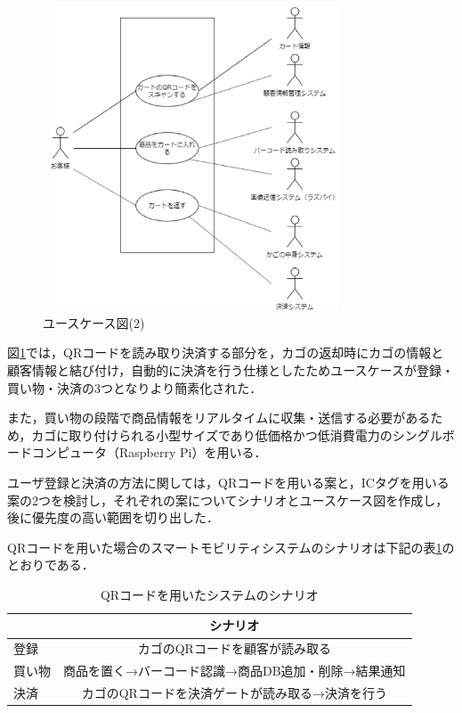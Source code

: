 \begin{figure}[htbp]
\centering
\includegraphics[height = 9cm,width = 9cm]{./picture/usecase3.eps}
\caption{ユースケース図(2)}
\label{usecase3}
\end{figure}


図\ref{usecase3}では，QRコードを読み取り決済する部分を，カゴの返却時にカゴの情報と顧客情報と結び付け，自動的に決済を行う仕様としたためユースケースが登録・買い物・決済の3つとなりより簡素化された．

また，買い物の段階で商品情報をリアルタイムに収集・送信する必要があるため，カゴに取り付けられる小型サイズであり低価格かつ低消費電力のシングルボードコンピュータ（Raspberry Pi）を用いる．

ユーザ登録と決済の方法に関しては，QRコードを用いる案と，ICタグを用いる案の2つを検討し，それぞれの案についてシナリオとユースケース図を作成し，後に優先度の高い範囲を切り出した．


QRコードを用いた場合のスマートモビリティシステムのシナリオは下記の表\ref{sina_qr}のとおりである．


\begin{table}[htb]
\begin{center}
\caption{QRコードを用いたシステムのシナリオ}
\begin{tabular}{|l|c|} \hline
 & シナリオ \\ \hline \hline
登録 & カゴのQRコードを顧客が読み取る \\
買い物 & 商品を置く→バーコード認識→商品DB追加・削除→結果通知 \\
決済 & カゴのQRコードを決済ゲートが読み取る→決済を行う \\ \hline
\end{tabular}
\label{sina_qr}
\end{center}
\end{table}

